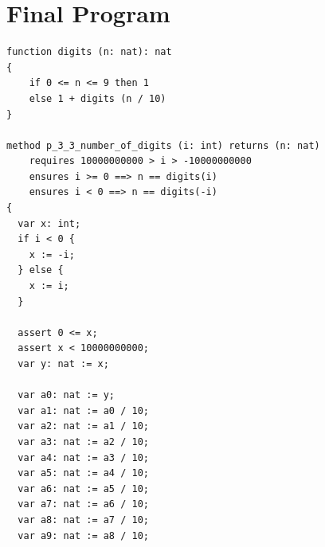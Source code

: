 \documentclass{article}
\begin{document}
\section*{Final Program}
\begin{lstlisting}
function digits (n: nat): nat
{
    if 0 <= n <= 9 then 1
    else 1 + digits (n / 10)
}

method p_3_3_number_of_digits (i: int) returns (n: nat)
	requires 10000000000 > i > -10000000000
	ensures i >= 0 ==> n == digits(i)
	ensures i < 0 ==> n == digits(-i)
{
  var x: int;
  if i < 0 {
    x := -i;
  } else {
    x := i;
  }

  assert 0 <= x;
  assert x < 10000000000;
  var y: nat := x;

  var a0: nat := y;
  var a1: nat := a0 / 10;
  var a2: nat := a1 / 10;
  var a3: nat := a2 / 10;
  var a4: nat := a3 / 10;
  var a5: nat := a4 / 10;
  var a6: nat := a5 / 10;
  var a7: nat := a6 / 10;
  var a8: nat := a7 / 10;
  var a9: nat := a8 / 10;


\end{lstlisting}
\end{document}
